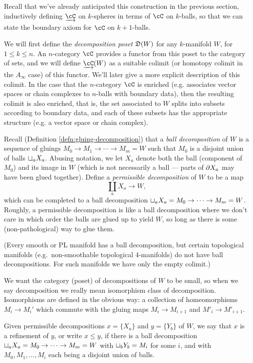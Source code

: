 Recall that we've already anticipated this construction in the previous section, 
inductively defining $\cl{\cC}$ on $k$-spheres in terms of $\cC$ on $k$-balls, 
so that we can state the boundary axiom for $\cC$ on $k+1$-balls.

\medskip

We will first define the {\it decomposition poset} $\mathfrak{D}(W)$ for any $k$-manifold $W$, for $1 \leq k \leq n$. 
An $n$-category $\cC$ provides a functor from this poset to the category of sets, 
and we  will define $\cl{\cC}(W)$ as a suitable colimit 
(or homotopy colimit in the $A_\infty$ case) of this functor. 
We'll later give a more explicit description of this colimit.
In the case that the $n$-category $\cC$ is enriched (e.g. associates vector spaces or chain 
complexes to $n$-balls with boundary data), 
then the resulting colimit is also enriched, that is, the set associated to $W$ splits into 
subsets according to boundary data, and each of these subsets has the appropriate structure 
(e.g. a vector space or chain complex).

Recall (Definition \ref{defn:gluing-decomposition}) that a {\it ball decomposition} of $W$ is a 
sequence of gluings $M_0\to M_1\to\cdots\to M_m = W$ such that $M_0$ is a disjoint union of balls
$\sqcup_a X_a$.
Abusing notation, we let $X_a$ denote both the ball (component of $M_0$) and
its image in $W$ (which is not necessarily a ball --- parts of $\partial X_a$ may have been glued together).
Define a {\it permissible decomposition} of $W$ to be a map
\[
	\coprod_a X_a \to W,
\]
which can be completed to a ball decomposition $\sqcup_a X_a = M_0\to\cdots\to M_m = W$.
Roughly, a permissible decomposition is like a ball decomposition where we don't care in which order the balls
are glued up to yield $W$, so long as there is some (non-pathological) way to glue them.

(Every smooth or PL manifold has a ball decomposition, but certain topological manifolds (e.g.\ non-smoothable
topological 4-manifolds) do not have ball decompositions.
For such manifolds we have only the empty colimit.)

We want the category (poset) of decompositions of $W$ to be small, so when we say decomposition we really
mean isomorphism class of decomposition.
Isomorphisms are defined in the obvious way: a collection of homeomorphisms $M_i\to M_i'$ which commute
with the gluing maps $M_i\to M_{i+1}$ and $M'_i\to M'_{i+1}$.

Given permissible decompositions $x = \{X_a\}$ and $y = \{Y_b\}$ of $W$, we say that $x$ is a refinement
of $y$, or write $x \le y$, if there is a ball decomposition $\sqcup_a X_a = M_0\to\cdots\to M_m = W$
with $\sqcup_b Y_b = M_i$ for some $i$,
and with $M_0, M_1, \ldots, M_i$ each being a disjoint union of balls.

